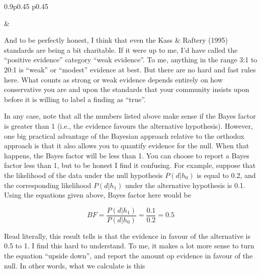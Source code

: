 \documentclass[
  a4paper,
]{book}
\begin{document}
\begin{table}[ht]
\begin{centerbox}
\begin{threeparttable}
\begin{tabularx}{0.9\textwidth}{p{} p{}}
\hhline{}

 &
 \tabularnewline[-0.5pt]


\end{tabularx} 

\end{threeparttable}\par\end{centerbox}

\end{table}
 

And to be perfectly honest, I think that even the Kass \& Raftery (1995)
standards are being a bit charitable. If it were up to me, I'd have
called the ``positive evidence'' category ``weak evidence''. To me,
anything in the range 3:1 to 20:1 is ``weak'' or ``modest'' evidence at
best. But there are no hard and fast rules here. What counts as strong
or weak evidence depends entirely on how conservative you are and upon
the standards that your community insists upon before it is willing to
label a finding as ``true''.

In any case, note that all the numbers listed above make sense if the
Bayes factor is greater than 1 (i.e., the evidence favours the
alternative hypothesis). However, one big practical advantage of the
Bayesian approach relative to the orthodox approach is that it also
allows you to quantify evidence for the null. When that happens, the
Bayes factor will be less than 1. You can choose to report a Bayes
factor less than 1, but to be honest I find it confusing. For example,
suppose that the likelihood of the data under the null hypothesis
\(P(d|h_0)\) is equal to 0.2, and the corresponding likelihood
\(P(d|h_1)\) under the alternative hypothesis is 0.1. Using the
equations given above, Bayes factor here would be

\[BF=\frac{P(d|h_1)}{P(d|h_0)}=\frac{0.1}{0.2}=0.5\]

Read literally, this result tells is that the evidence in favour of the
alternative is 0.5 to 1. I find this hard to understand. To me, it makes
a lot more sense to turn the equation ``upside down'', and report the
amount op evidence in favour of the null. In other words, what we
calculate is this
\end{document}
